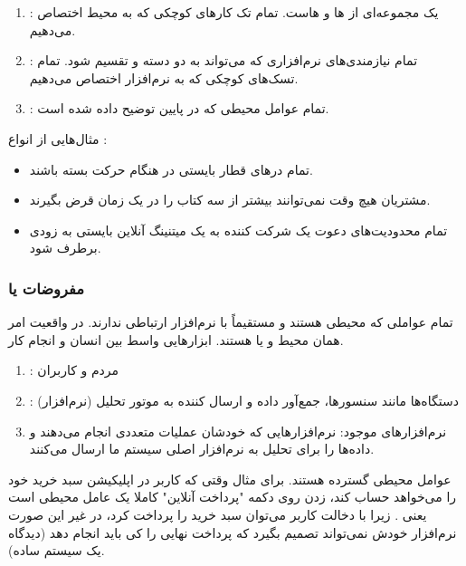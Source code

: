 \begin{enumerate}
    \item {}: یک  مجموعه‌ای از
    ها و هاست. تمام تک کار‌های کوچکی که
    به محیط اختصاص می‌دهیم.
    \item {}: تمام نیازمندی‌های نرم‌افزاری که می‌تواند به
    دو دسته  و  تقسیم شود. تمام تسک‌های کوچکی
    که به نرم‌افزار اختصاص می‌دهیم.
    \item {}: تمام عوامل محیطی که در پایین توضیح داده شده است.
\end{enumerate}

مثال‌هایی از انواع :

\begin{itemize}
    \item تمام در‌های قطار بایستی در هنگام حرکت بسته باشند.
    \item مشتریان هیچ وقت نمی‌توانند بیشتر از سه کتاب را در یک زمان قرض بگیرند.
    \item تمام محدودیت‌های دعوت یک شرکت کننده به یک میتنینگ آنلاین بایستی به
    زودی برطرف شود.
\end{itemize}

\subsubsection{مفروضات یا }

تمام عواملی که محیطی هستند و مستقیماً با نرم‌افزار ارتباطی ندارند. در واقعیت امر
همان محیط و یا  هستند. ابزار‌هایی واسط بین انسان و انجام کار.

\begin{enumerate}
    \item {}: مردم و کاربران
    \item {}: دستگاه‌ها مانند سنسور‌ها، جمع‌آور داده و ارسال کننده به
    موتور تحلیل (نرم‌افزار)
    \item {} نرم‌افزار‌های موجود: نرم‌افزار‌هایی که خودشان
    عملیات متعددی انجام می‌دهند و داده‌ها را برای تحلیل به نرم‌افزار اصلی سیستم
    ما ارسال می‌کنند.
\end{enumerate}

عوامل محیطی گسترده هستند. برای مثال وقتی که کاربر در اپلیکیشن سبد خرید خود را
می‌خواهد حساب کند، زدن روی دکمه "پرداخت آنلاین" کاملا یک عامل محیطی است یعنی
. زیرا با دخالت کاربر می‌توان سبد خرید را پرداخت کرد، در غیر این
صورت نرم‌افزار خودش نمی‌تواند تصمیم بگیرد که پرداخت نهایی را کی باید انجام دهد
(دیدگاه یک سیستم ساده).

